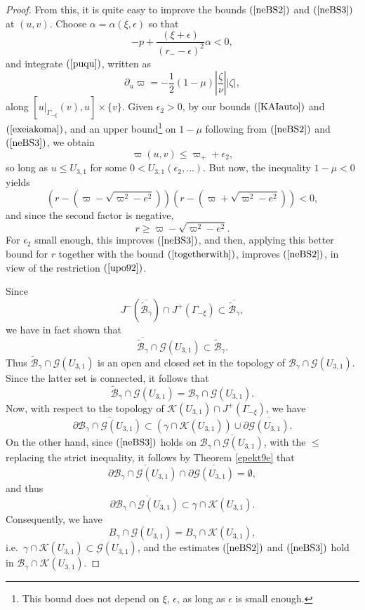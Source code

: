 \documentclass{article}
\newcommand{\zn}{\frac{\zeta}{\nu}}
\begin{document}
{\begin{proof}
From this, it is quite easy to improve the bounds $(\ref{neBS2})$ and
$(\ref{neBS3})$ at $(u,v)$. 
Choose $\alpha=\alpha(\xi,\epsilon)$ so that
\begin{equation}
\label{epilogn1}
-p+\frac{(\xi+\epsilon)}{(r_--\epsilon)^2}\alpha<0,
\end{equation}
and
integrate $(\ref{puqu})$,
written
as
\[
\partial_u\varpi=-\frac12(1-\mu)\left|\zn\right||\zeta|,
\]
along $\left[u|_{\Gamma_{-\xi}}(v),u\right]\times\{v\}$.
Given $\epsilon_2>0$, by 
our bounds $(\ref{KAIauto})$ and
$(\ref{exeiakoma})$, and 
an upper bound\footnote{This bound does not depend on $\xi$, $\epsilon$,
as long as $\epsilon$ is small enough.} on $1-\mu$ following from $(\ref{neBS2})$ and
$(\ref{neBS3})$,
we obtain
\begin{equation}
\label{togetherwith}
\varpi(u,v)\le\varpi_++\epsilon_2,
\end{equation}
so long as $u\le U_{3,1}$ for some
$0<U_{3,1}(\epsilon_2,\ldots)$. 
But now, the inequality
$1-\mu<0$ yields
\[
(r-(\varpi-\sqrt{\varpi^2-e^2}))
(r-(\varpi+\sqrt{\varpi^2-e^2}))<0,
\]
and since the second factor is negative,
\[
r\ge\varpi-\sqrt{\varpi^2-e^2}.
\]
For $\epsilon_2$ small enough, this improves $(\ref{neBS3})$,
and then, applying this better bound for $r$ together with the bound
$(\ref{togetherwith})$,
improves $(\ref{neBS2})$, in view of the restriction
$(\ref{upo92})$.

Since 
\[
J^-\left(\overline{\tilde{\mathcal{B}}_\gamma}\right)
\cap J^+(\Gamma_{-\xi})
\subset
\overline{\tilde{\mathcal{B}}_\gamma},
\]
we
have in fact shown that
\[
\overline{\tilde{\mathcal{B}}_\gamma}\cap\mathcal{G}(U_{3,1})
\subset
\tilde{\mathcal{B}}_\gamma.
\]
Thus $\tilde{\mathcal{B}}_\gamma\cap\mathcal{G}(U_{3,1})$ is an open and closed set
in the topology of $\mathcal{B}_\gamma\cap\mathcal{G}(U_{3,1})$. 
Since the latter set is connected, it follows
that
\[
\tilde{\mathcal{B}}_\gamma\cap\mathcal{G}(U_{3,1})=\mathcal{B}_\gamma
\cap\mathcal{G}(U_{3,1}).
\]
Now, with respect to the topology of $\mathcal{K}(U_{3,1})\cap J^+(\Gamma_{-\xi})$,
we have
\[
\partial\overline{\mathcal{B}_\gamma\cap\mathcal{G}(U_{3,1})}
\subset(\gamma\cap\mathcal{K}(U_{3,1}))\cup\partial\overline{\mathcal{G}(U_{3,1})}.
\]
On the other hand, since $(\ref{neBS3})$ holds on 
$\overline{\mathcal{B}_\gamma\cap\mathcal{G}(U_{3,1})}$, with the $\le$
replacing the strict inequality, it follows by Theorem
\ref{epekt9e} that 
\[
\partial\overline{\mathcal{B}_\gamma\cap\mathcal{G}(U_{3,1})}
\cap
\partial\overline{\mathcal{G}(U_{3,1})}=\emptyset,
\]
and thus 
\[
\partial\overline{\mathcal{B}_\gamma\cap\mathcal{G}(U_{3,1})}
\subset\gamma\cap\mathcal{K}(U_{3,1}).
\]
Consequently, we have
\[
B_\gamma\cap\mathcal{G}(U_{3,1})=
B_\gamma\cap\mathcal{K}(U_{3,1}),
\]
i.e.~$\gamma\cap\mathcal{K}(U_{3,1})\subset\mathcal{G}(U_{3,1})$, and
the estimates
$(\ref{neBS2})$ and $(\ref{neBS3})$ hold in 
$\mathcal{B}_\gamma\cap\mathcal{K}(U_{3,1})$.


\end{proof}}
\end{document}
